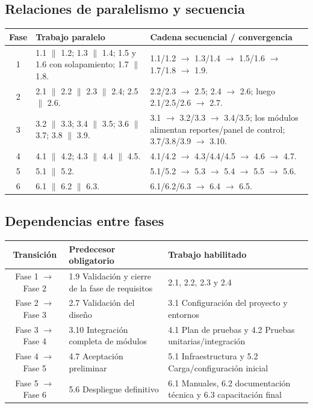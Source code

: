 \documentclass[12pt,a4paper]{article}
\begin{document}
\subsection{Relaciones de paralelismo y secuencia}

\begin{longtable}{|c|p{6.2cm}|p{7.7cm}|}
\hline
\rowcolor{tableheader}
\textbf{Fase} & \textbf{Trabajo paralelo} & \textbf{Cadena secuencial / convergencia} \\ \hline
1 & 1.1 $\parallel$ 1.2; 1.3 $\parallel$ 1.4; 1.5 y 1.6 con solapamiento; 1.7 $\parallel$ 1.8. & 1.1/1.2 $\rightarrow$ 1.3/1.4 $\rightarrow$ 1.5/1.6 $\rightarrow$ 1.7/1.8 $\rightarrow$ 1.9. \\ \hline
2 & 2.1 $\parallel$ 2.2 $\parallel$ 2.3 $\parallel$ 2.4; 2.5 $\parallel$ 2.6. & 2.2/2.3 $\rightarrow$ 2.5; 2.4 $\rightarrow$ 2.6; luego 2.1/2.5/2.6 $\rightarrow$ 2.7. \\ \hline
3 & 3.2 $\parallel$ 3.3; 3.4 $\parallel$ 3.5; 3.6 $\parallel$ 3.7; 3.8 $\parallel$ 3.9. & 3.1 $\rightarrow$ 3.2/3.3 $\rightarrow$ 3.4/3.5; los módulos alimentan reportes/panel de control; 3.7/3.8/3.9 $\rightarrow$ 3.10. \\ \hline
4 & 4.1 $\parallel$ 4.2; 4.3 $\parallel$ 4.4 $\parallel$ 4.5. & 4.1/4.2 $\rightarrow$ 4.3/4.4/4.5 $\rightarrow$ 4.6 $\rightarrow$ 4.7. \\ \hline
5 & 5.1 $\parallel$ 5.2. & 5.1/5.2 $\rightarrow$ 5.3 $\rightarrow$ 5.4 $\rightarrow$ 5.5 $\rightarrow$ 5.6. \\ \hline
6 & 6.1 $\parallel$ 6.2 $\parallel$ 6.3. & 6.1/6.2/6.3 $\rightarrow$ 6.4 $\rightarrow$ 6.5. \\ \hline
\end{longtable}

\subsection{Dependencias entre fases}

\begin{center}
\renewcommand{\arraystretch}{1.2}
\begin{tabularx}{\textwidth}{|c|X|X|}
\hline
\rowcolor{tableheader}
\textbf{Transición} & \textbf{Predecesor obligatorio} & \textbf{Trabajo habilitado} \\ \hline
Fase 1 $\rightarrow$ Fase 2 & 1.9 Validación y cierre de la fase de requisitos & 2.1, 2.2, 2.3 y 2.4 \\ \hline
Fase 2 $\rightarrow$ Fase 3 & 2.7 Validación del diseño & 3.1 Configuración del proyecto y entornos \\ \hline
Fase 3 $\rightarrow$ Fase 4 & 3.10 Integración completa de módulos & 4.1 Plan de pruebas y 4.2 Pruebas unitarias/integración \\ \hline
Fase 4 $\rightarrow$ Fase 5 & 4.7 Aceptación preliminar & 5.1 Infraestructura y 5.2 Carga/configuración inicial \\ \hline
Fase 5 $\rightarrow$ Fase 6 & 5.6 Despliegue definitivo & 6.1 Manuales, 6.2 documentación técnica y 6.3 capacitación final \\ \hline
\end{tabularx}
\end{center}
\end{document}

